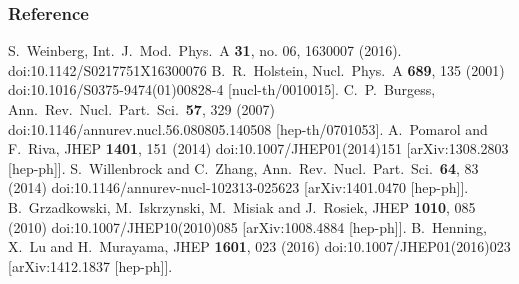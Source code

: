 \documentclass[8pt]{beamer}
\begin{document}
\begin{frame}
    \frametitle{Reference}
    \begin{thebibliography}{b}
    \footnotesize
	  S.~Weinberg,
	  Int.\ J.\ Mod.\ Phys.\ A {\bf 31}, no. 06, 1630007 (2016).
	  doi:10.1142/S0217751X16300076
	  B.~R.~Holstein,
	  Nucl.\ Phys.\ A {\bf 689}, 135 (2001)
	  doi:10.1016/S0375-9474(01)00828-4
	  [nucl-th/0010015].
	  C.~P.~Burgess,
	  Ann.\ Rev.\ Nucl.\ Part.\ Sci.\  {\bf 57}, 329 (2007)
	  doi:10.1146/annurev.nucl.56.080805.140508
	  [hep-th/0701053].
	  A.~Pomarol and F.~Riva,
	  JHEP {\bf 1401}, 151 (2014)
	  doi:10.1007/JHEP01(2014)151
	  [arXiv:1308.2803 [hep-ph]].
	S.~Willenbrock and C.~Zhang,
	  Ann.\ Rev.\ Nucl.\ Part.\ Sci.\  {\bf 64}, 83 (2014)
	  doi:10.1146/annurev-nucl-102313-025623
	 [arXiv:1401.0470 [hep-ph]].
	  B.~Grzadkowski, M.~Iskrzynski, M.~Misiak and J.~Rosiek,
	  JHEP {\bf 1010}, 085 (2010)
	  doi:10.1007/JHEP10(2010)085
	  [arXiv:1008.4884 [hep-ph]].
	 B.~Henning, X.~Lu and H.~Murayama,
	  JHEP {\bf 1601}, 023 (2016)
	  doi:10.1007/JHEP01(2016)023
	  [arXiv:1412.1837 [hep-ph]].

    \end{thebibliography}
\end{frame}
\end{document}
